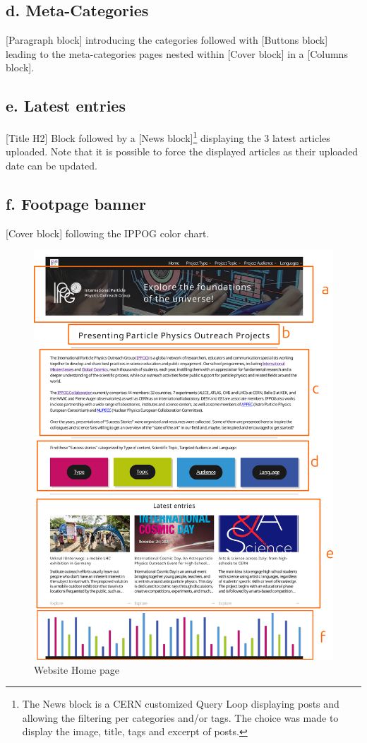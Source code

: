 \subsection*{d. Meta-Categories}
[Paragraph block] introducing the categories followed with [Buttons block] leading to the meta-categories pages nested within [Cover block] in a [Columns block].

\subsection*{e. Latest entries}
[Title H2] Block followed by a [News block]\footnote{The News block is a CERN customized Query Loop displaying posts and allowing the filtering per categories and/or tags. The choice was made to display the image, title, tags and excerpt of posts.} displaying the 3 latest articles uploaded. Note that it is possible to force the displayed articles as their uploaded date can be updated.

\subsection*{f. Footpage banner}
[Cover block] following the IPPOG color chart.

\begin{figure}[p]
    \centering
    \includegraphics[width=\linewidth]{Image/Architecture/home_page.png}
    \caption{Website Home page}
    \label{fig:home_page}
\end{figure}

